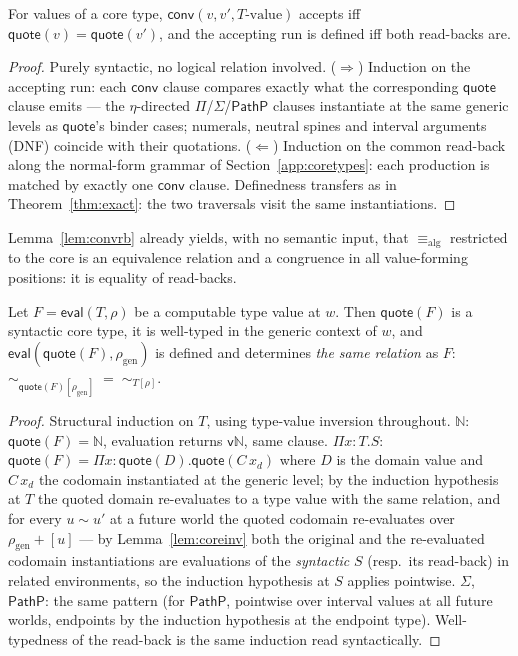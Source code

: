 \documentclass{lmcs}
\newcommand{\aconv}{\equiv_{\mathrm{alg}}}
\newcommand{\evalop}{\mathsf{eval}}
\newcommand{\convop}{\mathsf{conv}}
\newcommand{\quo}{\mathsf{quote}}
\begin{document}
\begin{lem}\label{lem:convrb}
  For values of a core type, $\convop(v, v', T\text{-value})$
  accepts iff $\quo(v) = \quo(v')$, and the accepting run is
  defined iff both read-backs are.
\end{lem}
\begin{proof}
  Purely syntactic, no logical relation involved.
  ($\Rightarrow$) Induction on the accepting run: each $\convop$
  clause compares exactly what the corresponding $\quo$ clause
  emits --- the $\eta$-directed $\Pi$/$\Sigma$/$\mathsf{PathP}$
  clauses instantiate at the same generic levels as
  $\quo$'s binder cases; numerals, neutral spines and interval
  arguments (DNF) coincide with their quotations.
  ($\Leftarrow$) Induction on the common read-back along the
  normal-form grammar of Section~\ref{app:coretypes}: each
  production is matched by exactly one $\convop$ clause.
  Definedness transfers as in Theorem~\ref{thm:exact}: the two
  traversals visit the same instantiations.
\end{proof}

\noindent Lemma~\ref{lem:convrb} already yields, with no semantic
input, that $\aconv$ restricted to the core is an equivalence
relation and a congruence in all value-forming positions: it is
equality of read-backs.

\begin{lem}\label{lem:typeidem}
  Let $F = \evalop(T, \rho)$ be a computable type value at $w$.
  Then $\quo(F)$ is a syntactic core type, it is well-typed in the
  generic context of $w$, and $\evalop(\quo(F), \rho_{\mathrm{gen}})$
  is defined and determines \emph{the same relation} as $F$:
  $\sim_{\quo(F)[\rho_{\mathrm{gen}}]} \;=\; \sim_{T[\rho]}$.
\end{lem}
\begin{proof}
  Structural induction on $T$, using type-value inversion
  throughout.  $\mathbb{N}$: $\quo(F) = \mathbb{N}$, evaluation
  returns $\mathsf{v}\mathbb{N}$, same clause.
  $\Pi x{:}T.S$: $\quo(F) = \Pi x{:}\quo(D).\quo(C\,x_d)$ where $D$
  is the domain value and $C\,x_d$ the codomain instantiated at the
  generic level; by the induction hypothesis at $T$ the quoted
  domain re-evaluates to a type value with the same relation, and
  for every $u \sim u'$ at a future world the quoted codomain
  re-evaluates over $\rho_{\mathrm{gen}}{+}[u]$ --- by
  Lemma~\ref{lem:coreinv} both the original and the re-evaluated
  codomain instantiations are evaluations of the \emph{syntactic}
  $S$ (resp.\ its read-back) in related environments, so the
  induction hypothesis at $S$ applies pointwise.  $\Sigma$,
  $\mathsf{PathP}$: the same pattern (for $\mathsf{PathP}$,
  pointwise over interval values at all future worlds, endpoints by
  the induction hypothesis at the endpoint type).  Well-typedness
  of the read-back is the same induction read syntactically.
\end{proof}
\end{document}
